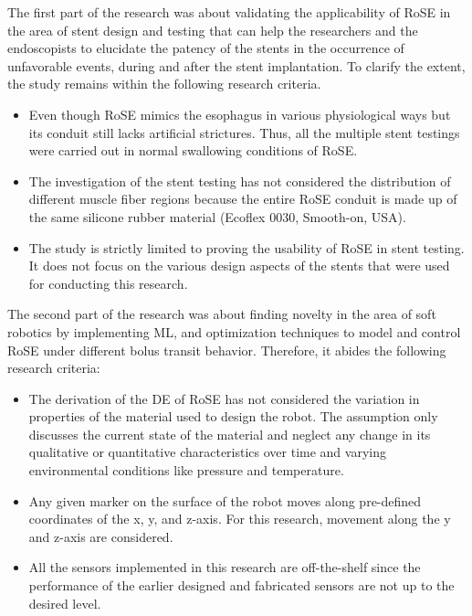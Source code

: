 The first part of the research was about validating the applicability of \ac{RoSE} in the area of stent design and testing that can help the researchers and the endoscopists to elucidate the patency of the stents in the occurrence of unfavorable events, during and after the stent implantation. To clarify the extent, the study remains within the following research criteria. 

\begin{itemize}
	
	\item Even though \ac{RoSE} mimics the esophagus in various physiological ways but its conduit still lacks artificial strictures. Thus, all the multiple stent testings were carried out in normal swallowing conditions of RoSE.  
	
	\item The investigation of the stent testing has not considered the distribution of different muscle fiber regions because the entire \ac{RoSE} conduit is made up of the same silicone rubber material (Ecoflex 0030, Smooth-on, USA).
	
	\item The study is strictly limited to proving the usability of \ac{RoSE} in stent testing. It does not focus on the various design aspects of the stents that were used for conducting this research.

\end{itemize}

The second part of the research was about finding novelty in the area of soft robotics by implementing \ac{ML}, and optimization techniques to model and control \ac{RoSE} under different bolus transit behavior. Therefore, it abides the following research criteria:

\begin{itemize}
	\item  The derivation of the \ac{DE} of \ac{RoSE} has not considered the variation in properties of the material used to design the robot. The assumption only discusses the current state of the material and neglect any change in its qualitative or quantitative characteristics over time and varying environmental conditions like pressure and temperature.
	
	\item Any given marker on the surface of the robot moves along pre-defined coordinates of the x, y, and z-axis. For this research, movement along the y and z-axis are considered.
	
	\item All the sensors implemented in this research are off-the-shelf since the performance of the earlier designed and fabricated sensors are not up to the desired level.   

\end{itemize}


